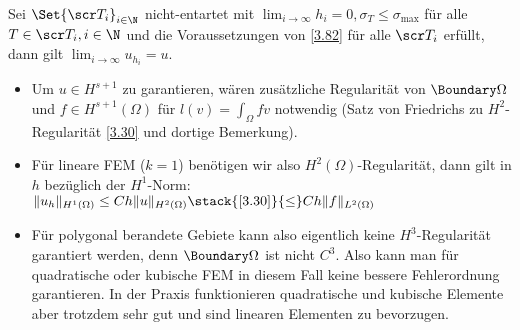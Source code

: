 \begin{kor} \label{3.83}
	Sei $\Set{\scr T_i}_{i\in \N}$ nicht-entartet mit $\lim_{i \to \infty} h_i = 0, \sigma_T \le \sigma_{\text{max}}$ für alle $T \in \scr T_i, i \in \N$ und die Voraussetzungen von \ref{3.82} für alle $\scr T_i$ erfüllt, dann gilt
	\begin{math}
		\lim_{i \to \infty} u_{h_i} = u.
	\end{math}
	\begin{note}
		\begin{itemize}
			\item
				Um $u \in H^{s+1}$ zu garantieren, wären zusätzliche Regularität von $\Boundary \Omega$ und $f \in H^{s+1}(\Omega)$ für $l(v) = \int_\Omega f v$ notwendig (Satz von Friedrichs zu $H^2$-Regularität \ref{3.30} und dortige Bemerkung).
			\item
				Für lineare FEM ($k = 1$) benötigen wir also $H^2(\Omega)$-Regularität, dann gilt  in $h$ bezüglich der $H^1$-Norm:
				\begin{math}
					\|u_h\|_{H^1(\Omega)} \le C h \|u\|_{H^2(\Omega)}
					\stack{\ref{3.30}}{\le} C h \|f\|_{L^2(\Omega)}
				\end{math}
			\item
				Für polygonal berandete Gebiete kann also eigentlich keine $H^3$-Regularität garantiert werden, denn $\Boundary \Omega$ ist nicht $C^3$.
				Also kann man für quadratische oder kubische FEM in diesem Fall keine bessere Fehlerordnung garantieren.
				In der Praxis funktionieren quadratische und kubische Elemente aber trotzdem sehr gut und sind linearen Elementen zu bevorzugen.
		\end{itemize}
	\end{note}
\end{kor}

